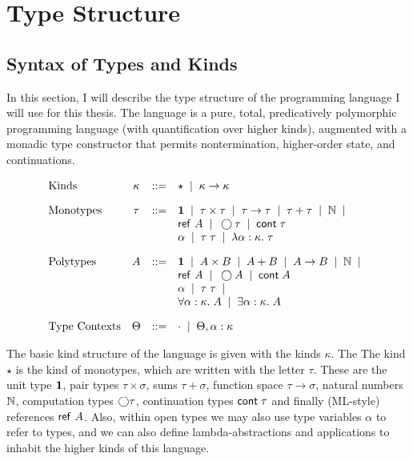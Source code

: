 \documentclass[12pt]{article}
\begin{document}
\section{Type Structure}

\subsection{Syntax of Types and Kinds}

In this section, I will describe the type structure of the 
programming language I will use for this thesis. The language is a
pure, total, predicatively polymorphic programming language (with
quantification over higher kinds), augmented with a monadic type
constructor that permits nontermination, higher-order state, and
continuations. 


\begin{displaymath}
  \begin{array}{lcll}
    \mbox{Kinds} & 
      \kappa & ::= & \star \;\;|\;\; \kappa \to \kappa 
    \\[1em]
    \mbox{Monotypes} & 
      \tau & ::= & 
         \mathbf{1} \;\;|\;\; 
         \tau \times \tau \;\;|\;\; 
         \tau \to \tau \;\;|\;\; 
         \tau + \tau \;\;|\;\;
         \mathbb{N} \;\;|\;\; \\
     &&& \mbox{\textsf{{ref }}}A \;\;|\;\;
         \bigcirc{\tau} \;\;|\;\; 
         \mbox{\textsf{{cont}}}\;{\tau} \\
     &&& \alpha \;\;|\;\;
         \tau\;\tau \;\;|\;\; 
         \lambda \alpha:\kappa.\;\tau 
    \\[1em]
    \mbox{Polytypes} & 
      A & ::= & 
         \mathbf{1} \;\;|\;\; 
         A \times B \;\;|\;\; 
         A + B \;\;|\;\;
         A \to B \;\;|\;\; 
         \mathbb{N} \;\;|\;\;  \\
    &&&  \mbox{\textsf{{ref }}}A \;\;|\;\;
         \bigcirc{A} \;\;|\;\; 
         \mbox{\textsf{{cont}}}\;{A} \\
    &&&  \alpha \;\;|\;\;
         \tau\;\tau \;\;|\;\; \\
    &&&  \forall \alpha:\kappa.\; A \;\;|\;\; 
         \exists \alpha:\kappa.\; A \\[1em]
    \mbox{Type Contexts} & 
      \Theta & ::= & \cdot \;\;|\;\; \Theta, \alpha:\kappa \\
  \end{array}
\end{displaymath}

The basic kind structure of the language is given with the kinds
$\kappa$. The The kind $\star$ is the kind of monotypes, which are
written with the letter $\tau$. These are the unit type $\mathbf{1}$,
pair types $\tau \times \sigma$, sums $\tau + \sigma$, function space
$\tau \to \sigma$, natural numbers $\mathbb{N}$, computation types
$\bigcirc{\tau}$, continuation types $\mbox{\textsf{{cont}}}\;{\tau}$ and finally
(ML-style) references $\mbox{\textsf{{ref }}}A$. Also, within open types we may
also use type variables $\alpha$ to refer to types, and we can also
define lambda-abstractions and applications to inhabit the higher
kinds of this language.
\end{document}
